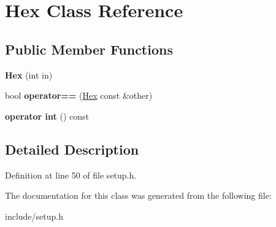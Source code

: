 \hypertarget{classHex}{\section{Hex Class Reference}
\label{classHex}
}
\subsection*{Public Member Functions}
\begin{DoxyCompactItemize}
\item 
\hypertarget{classHex_a965f0c9a560e141ef72e48fd62063f00}{{\bfseries Hex} (int in)}\label{classHex_a965f0c9a560e141ef72e48fd62063f00}

\item 
\hypertarget{classHex_a2f87c76d8bc64c0e2a49649d5bd5bcdb}{bool {\bfseries operator==} (\hyperlink{classHex}{Hex} const \&other)}\label{classHex_a2f87c76d8bc64c0e2a49649d5bd5bcdb}

\item 
\hypertarget{classHex_aba946c1cee6961c383f4bd0e5f6a2c81}{{\bfseries operator int} () const }\label{classHex_aba946c1cee6961c383f4bd0e5f6a2c81}

\end{DoxyCompactItemize}


\subsection{Detailed Description}


Definition at line 50 of file setup.\-h.



The documentation for this class was generated from the following file\-:\begin{DoxyCompactItemize}
\item 
include/setup.\-h\end{DoxyCompactItemize}
